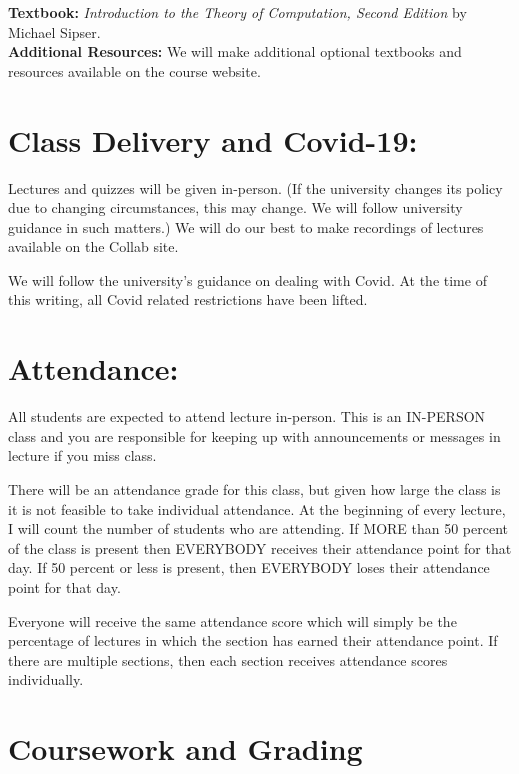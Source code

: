 \documentclass[12pt]{article}
\begin{document}
\textbf{Textbook:} \textit{Introduction to the Theory of Computation, Second Edition} by Michael Sipser.\\


\textbf{Additional Resources:} We will make additional optional textbooks and resources available on the course website.

\section*{Class Delivery and Covid-19:}

Lectures and quizzes will be given in-person.  (If the university changes its policy due to changing circumstances, this may change. We will follow university guidance in such matters.) We will do our best to make recordings of lectures available on the Collab site.

We will follow the university's guidance on dealing with Covid. At the time of this writing, all Covid related restrictions have been lifted.

\section*{Attendance:}

All students are expected to attend lecture in-person. This is an IN-PERSON class and you are responsible for keeping up with announcements or messages in lecture if you miss class. 

There will be an attendance grade for this class, but given how large the class is it is not feasible to take individual attendance. At the beginning of every lecture, I will count the number of students who are attending. If MORE than 50 percent of the class is present then EVERYBODY receives their attendance point for that day. If 50 percent or less is present, then EVERYBODY loses their attendance point for that day.

Everyone will receive the same attendance score which will simply be the percentage of lectures in which the section has earned their attendance point. If there are multiple sections, then each section receives attendance scores individually.

\section*{Coursework and Grading}
\end{document}
